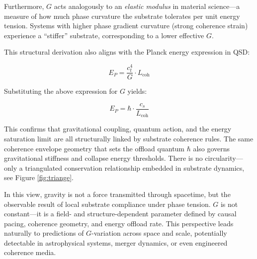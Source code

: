 \documentclass[entropy,article,submit,pdftex,moreauthors]{Definitions/mdpi}
\begin{document}
Furthermore, $G$ acts analogously to an \textit{elastic modulus} in material science—a measure of how much phase curvature the substrate tolerates per unit energy tension. Systems with higher phase gradient curvature (strong coherence strain) experience a “stiffer” substrate, corresponding to a lower effective $G$.

This structural derivation also aligns with the Planck energy expression in QSD:

\begin{equation}
E_P = \frac{c_t^4}{G} \cdot L_{\text{coh}}
\end{equation}

Substituting the above expression for $G$ yields:

\begin{equation}
E_P = \hbar \cdot \frac{c_s}{L_{\text{coh}}}
\end{equation}

This confirms that gravitational coupling, quantum action, and the energy saturation limit are all structurally linked by substrate coherence rules. The same coherence envelope geometry that sets the offload quantum $\hbar$ also governs gravitational stiffness and collapse energy thresholds. There is no circularity—only a triangulated conservation relationship embedded in substrate dynamics, see Figure \ref{fig:triange}.


\begin{center}
\end{center}

In this view, gravity is not a force transmitted through spacetime, but the observable result of local substrate compliance under phase tension. $G$ is not constant—it is a field- and structure-dependent parameter defined by causal pacing, coherence geometry, and energy offload rate. This perspective leads naturally to predictions of $G$-variation across space and scale, potentially detectable in astrophysical systems, merger dynamics, or even engineered coherence media.
\end{document}
